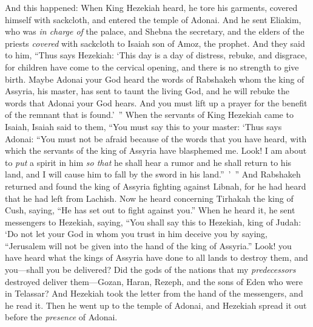 \begin{biblechapter} %
 And this happened: When King Hezekiah heard, he tore his garments, covered himself with sackcloth, and entered the temple of Adonai.
\verse And he sent Eliakim, who was \textit{in charge of} the palace, and Shebna the secretary, and the elders of the priests \textit{covered} with sackcloth to Isaiah son of Amoz, the prophet.
\verse And they said to him, “Thus says Hezekiah: ‘This day is a day of distress, rebuke, and disgrace, for children have come to the cervical opening, and there is no strength to give birth.
\verse Maybe Adonai your God heard the words of Rabshakeh whom the king of Assyria, his master, has sent to taunt the living God, and he will rebuke the words that Adonai your God hears. And you must lift up a prayer for the benefit of the remnant that is found.’ ”
\verse When the servants of King Hezekiah came to Isaiah,
\verse Isaiah said to them, “You must say this to your master: ‘Thus says Adonai: “You must not be afraid because of the words that you have heard, with which the servants of the king of Assyria have blasphemed me.
\verse Look! I am about to \textit{put} a spirit in him \textit{so that} he shall hear a rumor and he shall return to his land, and I will cause him to fall by the sword in his land.” ’ ”
\verse And Rabshakeh returned and found the king of Assyria fighting against Libnah, for he had heard that he had left from Lachish.
\verse Now he heard concerning Tirhakah the king of Cush, saying, “He has set out to fight against you.”
\verse When he heard it, he sent messengers to Hezekiah, saying,
\verse “You shall say this to Hezekiah, king of Judah: ‘Do not let your God in whom you trust in him deceive you by saying, “Jerusalem will not be given into the hand of the king of Assyria.”
\verse Look! you have heard what the kings of Assyria have done to all lands to destroy them, and you—shall you be delivered?
\verse Did the gods of the nations that my \textit{predecessors} destroyed deliver them—Gozan, Haran, Rezeph, and the sons of Eden who were in Telassar?
 And Hezekiah took the letter from the hand of the messengers, and he read it. Then he went up to the temple of Adonai, and Hezekiah spread it out before the \textit{presence} of Adonai.

\end{biblechapter}
